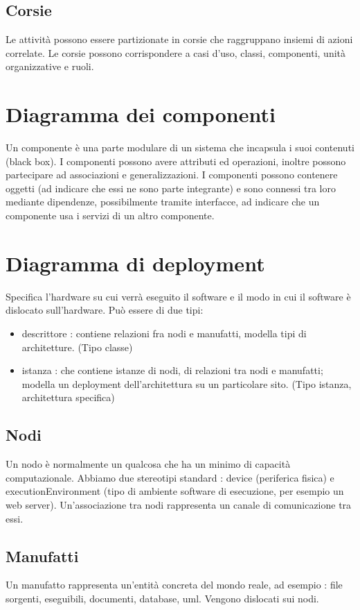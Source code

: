 \documentclass[a4paper,12pt]{report}
\begin{document}
	\subsection{Corsie}
	Le attività possono essere partizionate in corsie che raggruppano insiemi di azioni correlate.
	Le corsie possono corrispondere a casi d'uso, classi, componenti, unità organizzative e ruoli.
	\section{Diagramma dei componenti}
	Un componente è una parte modulare di un sistema che incapsula i suoi contenuti (black box). I componenti possono avere attributi ed operazioni, inoltre possono partecipare ad associazioni e generalizzazioni. I componenti possono contenere oggetti (ad indicare che essi ne sono parte integrante) e sono connessi tra loro mediante dipendenze, possibilmente tramite interfacce, ad indicare che un componente usa i servizi di un altro componente.
	\section{Diagramma di deployment}
	Specifica l'hardware su cui verrà eseguito il software e il modo in cui il software è dislocato sull'hardware.
	Può essere di due tipi:
	\begin{itemize}
		\item descrittore : contiene relazioni fra nodi e manufatti, modella tipi di architetture. (Tipo classe)
		\item istanza : che contiene istanze di nodi, di relazioni tra nodi e manufatti; modella un deployment dell'architettura su un particolare sito. (Tipo istanza, architettura specifica)
	\end{itemize}
	\subsection{Nodi}
	Un nodo è normalmente un qualcosa che ha un minimo di capacità computazionale. Abbiamo due stereotipi standard : device (periferica fisica) e executionEnvironment (tipo di ambiente software di esecuzione, per esempio un web server).
	Un'associazione tra nodi rappresenta un canale di comunicazione tra essi.
	\subsection{Manufatti}
	Un manufatto rappresenta un'entità concreta del mondo reale, ad esempio : file sorgenti, eseguibili, documenti, database, uml. Vengono dislocati sui nodi.
\end{document}
